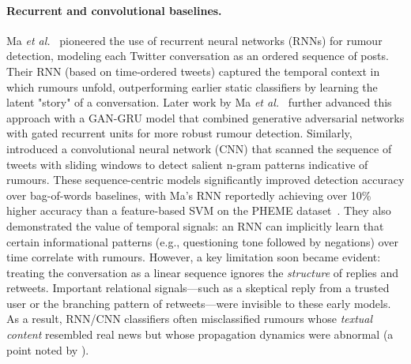 \documentclass{cshonours}
\begin{document}
\paragraph{Recurrent and convolutional baselines.} Ma \textit{et al.}~\cite{ma2016detecting} pioneered the use of recurrent neural networks (RNNs) for rumour detection, modeling each Twitter conversation as an ordered sequence of posts. Their RNN (based on time-ordered tweets) captured the temporal context in which rumours unfold, outperforming earlier static classifiers by learning the latent "story" of a conversation. Later work by Ma \textit{et al.}~\cite{ma2021temporal} further advanced this approach with a GAN-GRU model that combined generative adversarial networks with gated recurrent units for more robust rumour detection. Similarly, \cite{yu2017cnn} introduced a convolutional neural network (CNN) that scanned the sequence of tweets with sliding windows to detect salient n-gram patterns indicative of rumours. These sequence-centric models significantly improved detection accuracy over bag-of-words baselines, with Ma's RNN reportedly achieving over 10\% higher accuracy than a feature-based SVM on the PHEME dataset~\cite{ma2016detecting}. They also demonstrated the value of temporal signals: an RNN can implicitly learn that certain informational patterns (e.g., questioning tone followed by negations) over time correlate with rumours. However, a key limitation soon became evident: treating the conversation as a linear sequence ignores the \emph{structure} of replies and retweets. Important relational signals—such as a skeptical reply from a trusted user or the branching pattern of retweets—were invisible to these early models. As a result, RNN/CNN classifiers often misclassified rumours whose \emph{textual content} resembled real news but whose propagation dynamics were abnormal (a point noted by \cite{zubiaga2018survey}).
\end{document}
